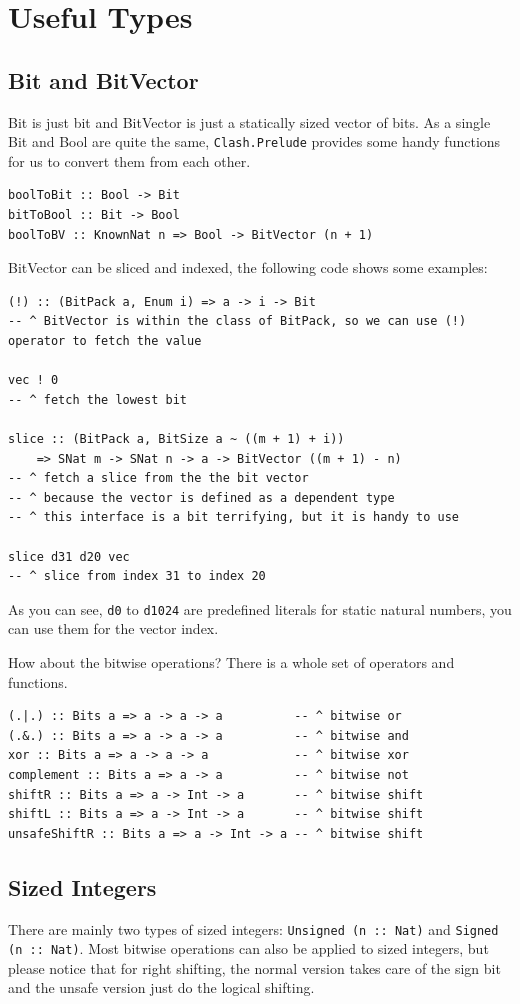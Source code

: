 \documentclass[a4paper,12pt, oneside]{book}
\begin{document}
\section{Useful Types}
\subsection{Bit and BitVector}
Bit is just bit and BitVector is just a statically sized vector of bits. As a single Bit and Bool are quite the same, \texttt{Clash.Prelude} provides some handy functions for us to convert them from each other.
\begin{verbatim}
boolToBit :: Bool -> Bit
bitToBool :: Bit -> Bool
boolToBV :: KnownNat n => Bool -> BitVector (n + 1)
\end{verbatim}
BitVector can be sliced and indexed, the following code shows some examples:
\begin{verbatim}
(!) :: (BitPack a, Enum i) => a -> i -> Bit
-- ^ BitVector is within the class of BitPack, so we can use (!) operator to fetch the value

vec ! 0
-- ^ fetch the lowest bit

slice :: (BitPack a, BitSize a ~ ((m + 1) + i)) 
    => SNat m -> SNat n -> a -> BitVector ((m + 1) - n)
-- ^ fetch a slice from the the bit vector
-- ^ because the vector is defined as a dependent type
-- ^ this interface is a bit terrifying, but it is handy to use

slice d31 d20 vec
-- ^ slice from index 31 to index 20
\end{verbatim}
As you can see, \texttt{d0} to \texttt{d1024} are predefined literals for static natural numbers, you can use them for the vector index.

How about the bitwise operations? There is a whole set of operators and functions.
\begin{verbatim}
(.|.) :: Bits a => a -> a -> a          -- ^ bitwise or
(.&.) :: Bits a => a -> a -> a          -- ^ bitwise and
xor :: Bits a => a -> a -> a            -- ^ bitwise xor
complement :: Bits a => a -> a          -- ^ bitwise not
shiftR :: Bits a => a -> Int -> a       -- ^ bitwise shift
shiftL :: Bits a => a -> Int -> a       -- ^ bitwise shift
unsafeShiftR :: Bits a => a -> Int -> a -- ^ bitwise shift
\end{verbatim}
\subsection{Sized Integers}
There are mainly two types of sized integers: \texttt{Unsigned (n :: Nat)} and
\texttt{Signed (n :: Nat)}. Most bitwise operations can also be applied to sized integers, but please notice that for right shifting, the normal version takes care of the sign bit and the unsafe version just do the logical shifting.
\end{document}
